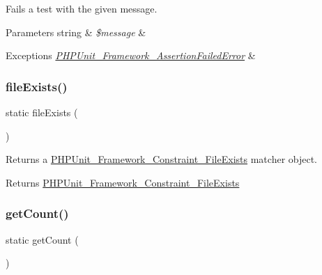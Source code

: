 Fails a test with the given message.


\begin{DoxyParams}[1]{Parameters}
string & {\em \$message} & \\
\hline
\end{DoxyParams}

\begin{DoxyExceptions}{Exceptions}
{\em \mbox{\hyperlink{class_p_h_p_unit___framework___assertion_failed_error}{P\+H\+P\+Unit\+\_\+\+Framework\+\_\+\+Assertion\+Failed\+Error}}} & \\
\hline
\end{DoxyExceptions}
\mbox{\label{class_p_h_p_unit___framework___assert_af38b35545d38d249c689615a4bc46ec1}} 
\subsubsection{\texorpdfstring{file\+Exists()}{fileExists()}}
{\footnotesize\ttfamily static file\+Exists (\begin{DoxyParamCaption}{ }\end{DoxyParamCaption})\hspace{0.3cm}{\ttfamily [static]}}

Returns a \mbox{\hyperlink{class_p_h_p_unit___framework___constraint___file_exists}{P\+H\+P\+Unit\+\_\+\+Framework\+\_\+\+Constraint\+\_\+\+File\+Exists}} matcher object.

\begin{DoxyReturn}{Returns}
\mbox{\hyperlink{class_p_h_p_unit___framework___constraint___file_exists}{P\+H\+P\+Unit\+\_\+\+Framework\+\_\+\+Constraint\+\_\+\+File\+Exists}} 
\end{DoxyReturn}
\mbox{\label{class_p_h_p_unit___framework___assert_a9f70d3865f00e8c356111d4e246bb50d}} 
\subsubsection{\texorpdfstring{get\+Count()}{getCount()}}
{\footnotesize\ttfamily static get\+Count (\begin{DoxyParamCaption}{ }\end{DoxyParamCaption})\hspace{0.3cm}{\ttfamily [static]}}

